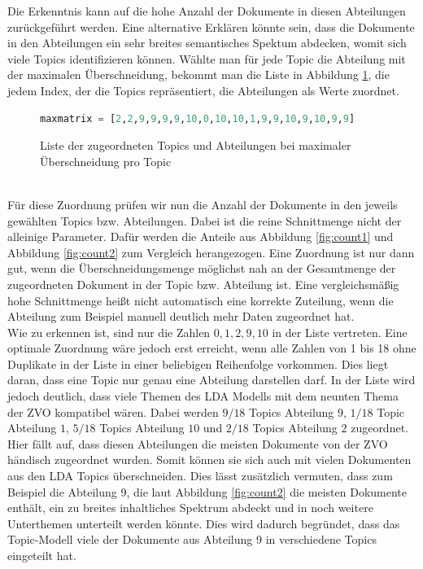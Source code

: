 \documentclass[german,version-2020-11]{uzl-thesis}
\begin{document}
Die Erkenntnis kann auf die hohe Anzahl der Dokumente in diesen Abteilungen zurückgeführt werden. Eine alternative Erklären könnte sein, dass die Dokumente in den Abteilungen ein sehr breites semantisches Spektum abdecken, womit sich viele Topics identifizieren können. Wählte man für jede Topic die Abteilung mit der maximalen Überschneidung, bekommt man die Liste in Abbildung \ref{fig:maxlist}, die jedem Index, der die Topics repräsentiert, die Abteilungen als Werte zuordnet.

\begin{figure}[H]
\begin{center}
\begin{lstlisting}[language=Python]
maxmatrix = [2,2,9,9,9,9,10,0,10,10,1,9,9,10,9,10,9,9]
\end{lstlisting}
\caption{Liste der zugeordneten Topics und Abteilungen bei maximaler Überschneidung pro Topic}
\label{fig:maxlist}
\end{center}
\end{figure}\\


Für diese Zuordnung prüfen wir nun die Anzahl der Dokumente in den jeweils gewählten Topics bzw. Abteilungen. Dabei ist die reine Schnittmenge nicht der alleinige Parameter. Dafür werden die Anteile aus Abbildung \ref{fig:count1} und Abbildung \ref{fig:count2} zum Vergleich herangezogen. Eine Zuordnung ist nur dann gut, wenn die Überschneidungsmenge möglichst nah an der Gesamtmenge der zugeordneten Dokument in der Topic bzw. Abteilung ist. Eine vergleichsmäßig hohe Schnittmenge heißt nicht automatisch eine korrekte Zuteilung, wenn die Abteilung zum Beispiel manuell deutlich mehr Daten zugeordnet hat.\\


Wie zu erkennen ist, sind nur die Zahlen $ 0,1,2,9,10 $ in der Liste vertreten. Eine optimale Zuordnung wäre jedoch erst erreicht, wenn alle Zahlen von 1 bis 18 ohne Duplikate in der Liste in einer beliebigen Reihenfolge vorkommen. Dies liegt daran, dass eine Topic nur genau eine Abteilung darstellen darf. In der Liste wird jedoch deutlich, dass viele Themen des LDA Modells mit dem neunten Thema der ZVO kompatibel wären. Dabei werden $9/18$ Topics Abteilung $9$, $1/18$ Topic Abteilung $1$, $5/18$ Topics Abteilung $10$ und $2/18$ Topics Abteilung $2$ zugeordnet. Hier fällt auf, dass diesen Abteilungen die meisten Dokumente von der ZVO händisch zugeordnet wurden. Somit können sie sich auch mit vielen Dokumenten aus den LDA Topics überschneiden. Dies lässt zusätzlich vermuten, dass zum Beispiel die Abteilung 9, die laut Abbildung \ref{fig:count2} die meisten Dokumente enthält, ein zu breites inhaltliches Spektrum abdeckt und in noch weitere Unterthemen unterteilt werden könnte. Dies wird dadurch begründet, dass das Topic-Modell viele der Dokumente aus Abteilung 9 in verschiedene Topics eingeteilt hat.\\
\end{document}
